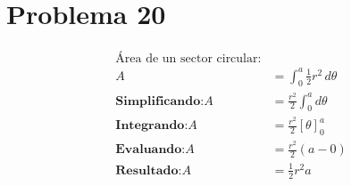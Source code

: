 \documentclass[12pt]{article}
\newcommand{\problema}[1]{\section*{Problema #1}}
\newcommand{\integrando}{\textbf{Integrando:} }
\newcommand{\evaluando}{\textbf{Evaluando:} }
\newcommand{\simplificando}{\textbf{Simplificando:} }
\newcommand{\obteniendo}{\textbf{Resultado:} }
\begin{document}
	\vspace{0.5cm}
	
	\problema{20}
	\begin{align*}
		\text{Área de un sector circular:} \\
		A &= \int_{0}^{a} \frac{1}{2} r^2 \, d\theta \\
		\simplificando A &= \frac{r^2}{2} \int_{0}^{a} d\theta \\
		\integrando A &= \frac{r^2}{2} \left[ \theta \right]_{0}^{a} \\
		\evaluando A &= \frac{r^2}{2} (a - 0) \\
		\obteniendo A &= \boxed{\frac{1}{2} r^2 a}
	\end{align*}
\end{document}
